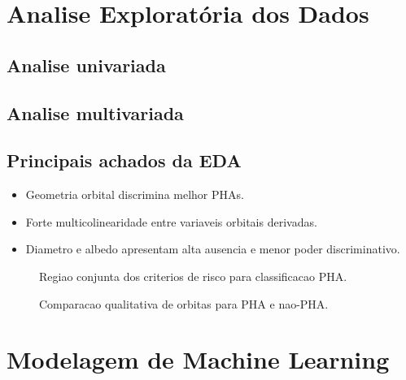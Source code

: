\documentclass[conference]{IEEEtran}
\begin{document}
\section{Analise Explorat\'oria dos Dados}
\subsection{Analise univariada}

\subsection{Analise multivariada}

\subsection{Principais achados da EDA}
\begin{itemize}[leftmargin=*]
    \item Geometria orbital discrimina melhor PHAs.
    \item Forte multicolinearidade entre variaveis orbitais derivadas.
    \item Diametro e albedo apresentam alta ausencia e menor poder discriminativo.
\end{itemize}

\begin{figure}[!t]
    \centering
    \caption{Regiao conjunta dos criterios de risco para classificacao PHA.}
    \label{fig:final_plot_1}
\end{figure}

\begin{figure}[!t]
    \centering
    \caption{Comparacao qualitativa de orbitas para PHA e nao-PHA.}
    \label{fig:final_plot_2}
\end{figure}

\section{Modelagem de Machine Learning}
\end{document}

